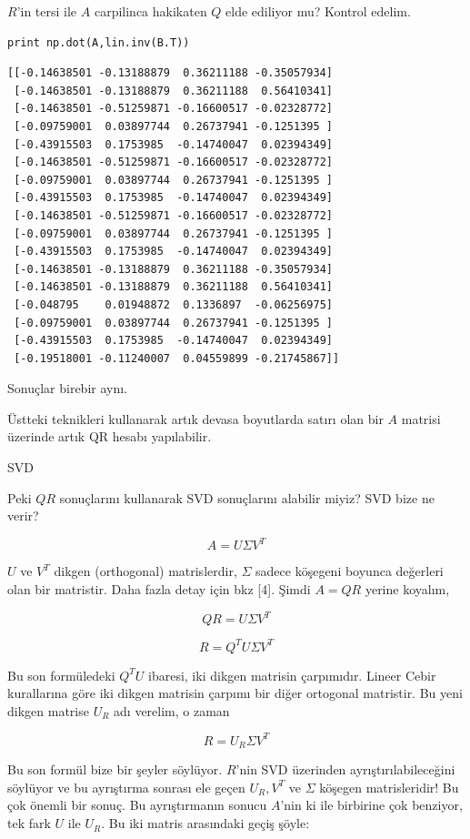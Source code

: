 \documentclass[12pt,fleqn]{article}\usepackage{../../common}
\begin{document}
$R$'in tersi ile $A$ carpilinca hakikaten $Q$ elde ediliyor mu?
Kontrol edelim.

\begin{verbatim}
print np.dot(A,lin.inv(B.T))
\end{verbatim}

\begin{verbatim}
[[-0.14638501 -0.13188879  0.36211188 -0.35057934]
 [-0.14638501 -0.13188879  0.36211188  0.56410341]
 [-0.14638501 -0.51259871 -0.16600517 -0.02328772]
 [-0.09759001  0.03897744  0.26737941 -0.1251395 ]
 [-0.43915503  0.1753985  -0.14740047  0.02394349]
 [-0.14638501 -0.51259871 -0.16600517 -0.02328772]
 [-0.09759001  0.03897744  0.26737941 -0.1251395 ]
 [-0.43915503  0.1753985  -0.14740047  0.02394349]
 [-0.14638501 -0.51259871 -0.16600517 -0.02328772]
 [-0.09759001  0.03897744  0.26737941 -0.1251395 ]
 [-0.43915503  0.1753985  -0.14740047  0.02394349]
 [-0.14638501 -0.13188879  0.36211188 -0.35057934]
 [-0.14638501 -0.13188879  0.36211188  0.56410341]
 [-0.048795    0.01948872  0.1336897  -0.06256975]
 [-0.09759001  0.03897744  0.26737941 -0.1251395 ]
 [-0.43915503  0.1753985  -0.14740047  0.02394349]
 [-0.19518001 -0.11240007  0.04559899 -0.21745867]]
\end{verbatim}

Sonuçlar birebir aynı.

Üstteki teknikleri kullanarak artık devasa boyutlarda satırı olan bir $A$
matrisi üzerinde artık QR hesabı yapılabilir.

SVD

Peki $QR$ sonuçlarını kullanarak SVD sonuçlarını alabilir miyiz?  SVD bize ne
verir?

$$ A = U \Sigma V^T $$

$U$ ve $V^T$ dikgen (orthogonal) matrislerdir, $\Sigma$ sadece köşegeni
boyunca değerleri olan bir matristir. Daha fazla detay için bkz [4]. Şimdi
$A = QR$ yerine koyalım,

$$ QR =  U \Sigma V^T $$

$$ R = Q^T U \Sigma V^T $$

Bu son formüledeki $Q^TU$ ibaresi, iki dikgen matrisin çarpımıdır. Lineer Cebir
kurallarına göre iki dikgen matrisin çarpımı bir diğer ortogonal matristir. Bu
yeni dikgen matrise $U_R$ adı verelim, o zaman

$$ R = U_R \Sigma V^T $$

Bu son formül bize bir şeyler söylüyor. $R$'nin SVD üzerinden
ayrıştırılabileceğini söylüyor ve bu ayrıştırma sonrası ele geçen $U_R,V^T$ ve
$\Sigma$ köşegen matrisleridir! Bu çok önemli bir sonuç.  Bu ayrıştırmanın
sonucu $A$'nin ki ile birbirine çok benziyor, tek fark $U$ ile $U_R$. Bu iki
matris arasındaki geçiş şöyle:
\end{document}
